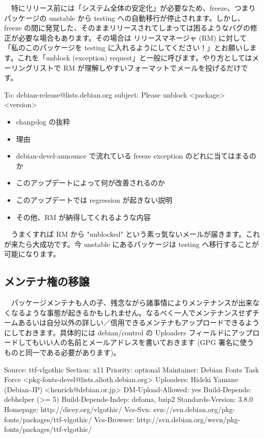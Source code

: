 \documentclass[mingoth,a4paper]{jsarticle}
\begin{document}
　特にリリース前には「システム全体の安定化」が必要なため、freeze、つまりパッケージの unstable から testing への自動移行が停止されます。しかし、freeze の間に発覚した、そのままリリースされてしまっては困るようなバグの修正が必要な場合もあります。その場合は リリースマネージャ (RM) に対して「私のこのパッケージを testing に入れるようにしてください！」とお願いします。これを「unblock (exception) request」と一般に呼びます。やり方としてはメーリングリストで RM が理解しやすいフォーマットでメールを投げるだけです。

\begin{commandline}
To: debian-release@lists.debian.org
subject: Please unblock <package> <version>

\begin{itemize}
 \item changelog の抜粋
 \item 理由
 \item debian-devel-announce で流れている freeze exception のどれに当てはまるのか
 \item このアップデートによって何が改善されるのか
 \item このアップデートでは regression が起きない説明
 \item その他、RM が納得してくれるような内容
\end{itemize}

\end{commandline}

　うまくすれば RM から "unblocked" という素っ気ないメールが届きます。これが来たら大成功です。今 unstable にあるパッケージは testing へ移行することが可能になります。


\subsection{メンテナ権の移譲}

　パッケージメンテナも人の子、残念ながら諸事情によりメンテナンスが出来なくなるような事態が起きるかもしれません。なるべく一人でメンテナンスせずチームあるいは自分以外の詳しい／信用できるメンテナもアップロードできるようにしておきます。具体的には debian/control の Uploaders フィールドにアップロードしてもいい人の名前とメールアドレスを書いておきます (GPG 署名に使うものと同一である必要があります)。

\begin{commandline}
Source: ttf-vlgothic
Section: x11
Priority: optional
Maintainer: Debian Fonts Task Force <pkg-fonts-devel@lists.alioth.debian.org>
Uploaders: Hideki Yamane (Debian-JP) <henrich@debian.or.jp>
DM-Upload-Allowed: yes
Build-Depends: debhelper (>= 5)
Build-Depends-Indep: defoma, bzip2
Standards-Version: 3.8.0
Homepage: http://dicey.org/vlgothic/
Vcs-Svn: svn://svn.debian.org/pkg-fonts/packages/ttf-vlgothic/
Vcs-Browser: http://svn.debian.org/wsvn/pkg-fonts/packages/ttf-vlgothic/
\end{commandline}
\end{document}
